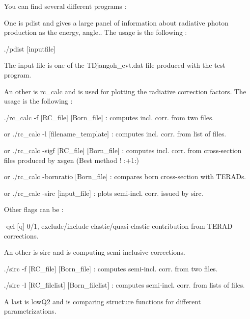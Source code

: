 You can find several different programs \+:
\begin{DoxyItemize}
\item One is {\ttfamily pdist} and gives a large panel of information about radiative photon production as the energy, angle.. The usage is the following \+:
\begin{DoxyItemize}
\item {\ttfamily ./pdist \mbox{[}inputfile\mbox{]}}
\item The input file is one of the {\ttfamily T\+Djangoh\+\_\+evt.\+dat} file produced with the {\ttfamily test} program.
\end{DoxyItemize}
\item An other is {\ttfamily rc\+\_\+calc} and is used for plotting the radiative correction factors. The usage is the following \+:
\begin{DoxyItemize}
\item {\ttfamily ./rc\+\_\+calc -\/f \mbox{[}R\+C\+\_\+file\mbox{]} \mbox{[}Born\+\_\+file\mbox{]}} \+: computes incl. corr. from two files.
\item or {\ttfamily ./rc\+\_\+calc -\/l \mbox{[}filename\+\_\+template\mbox{]}} \+: computes incl. corr. from list of files.
\item or {\ttfamily ./rc\+\_\+calc -\/sigf \mbox{[}R\+C\+\_\+file\mbox{]} \mbox{[}Born\+\_\+file\mbox{]}} \+: computes incl. corr. from cross-\/section files produced by {\ttfamily xsgen} (Best method ! \+:+1\+:)
\item or {\ttfamily ./rc\+\_\+calc -\/bornratio \mbox{[}Born\+\_\+file\mbox{]}} \+: compares born cross-\/section with T\+E\+R\+AD\textquotesingle{}s.
\item or {\ttfamily ./rc\+\_\+calc -\/sirc \mbox{[}input\+\_\+file\mbox{]}} \+: plots semi-\/incl. corr. issued by {\ttfamily sirc}.
\item Other flags can be \+:
\begin{DoxyItemize}
\item {\ttfamily -\/qel \mbox{[}q\mbox{]}} 0/1, exclude/include elastic/quasi-\/elastic contribution from T\+E\+R\+AD corrections.
\end{DoxyItemize}
\end{DoxyItemize}
\item An other is {\ttfamily sirc} and is computing semi-\/inclusive corrections.
\begin{DoxyItemize}
\item {\ttfamily ./sirc -\/f \mbox{[}R\+C\+\_\+file\mbox{]} \mbox{[}Born\+\_\+file\mbox{]}} \+: computes semi-\/incl. corr. from two files.
\item {\ttfamily ./sirc -\/l \mbox{[}R\+C\+\_\+filelist\mbox{]} \mbox{[}Born\+\_\+filelist\mbox{]}} \+: computes semi-\/incl. corr. from lists of files.
\end{DoxyItemize}
\item A last is {\ttfamily low\+Q2} and is comparing structure functions for different parametrizations. 
\end{DoxyItemize}